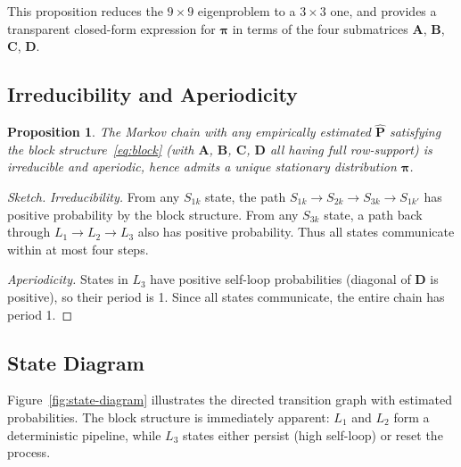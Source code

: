 \documentclass[12pt,a4paper]{article}
\newtheorem{proposition}{Proposition}
\newcommand{\piv}{\boldsymbol{\pi}}
\newcommand{\mat}[1]{\mathbf{#1}}
\begin{document}
This proposition reduces the $9\times9$ eigenproblem to a $3\times3$ one,
and provides a transparent closed-form expression for $\piv$ in terms of the
four submatrices $\mat{A}$, $\mat{B}$, $\mat{C}$, $\mat{D}$.

\subsection{Irreducibility and Aperiodicity}
\label{sec:irred}

\begin{proposition}\label{prop:stationary}
The Markov chain with any empirically estimated $\hat{\mat{P}}$ satisfying
the block structure~\eqref{eq:block} (with $\mat{A}$, $\mat{B}$, $\mat{C}$,
$\mat{D}$ all having full row-support) is irreducible and aperiodic, hence
admits a unique stationary distribution $\piv$.
\end{proposition}

\begin{proof}[Sketch]
\emph{Irreducibility.}  From any $S_{1k}$ state, the path
$S_{1k} \to S_{2k} \to S_{3k} \to S_{1k'}$ has positive probability by the
block structure.  From any $S_{3k}$ state, a path back through $L_1 \to L_2 \to L_3$
also has positive probability.  Thus all states communicate within at most four
steps.

\emph{Aperiodicity.}  States in $L_3$ have positive self-loop probabilities
(diagonal of $\mat{D}$ is positive), so their period is 1.  Since all states
communicate, the entire chain has period 1.
\end{proof}

\subsection{State Diagram}
\label{sec:diagram}

Figure~\ref{fig:state-diagram} illustrates the directed transition graph with
estimated probabilities.  The block structure is immediately apparent: $L_1$
and $L_2$ form a deterministic pipeline, while $L_3$ states either persist
(high self-loop) or reset the process.
\end{document}

